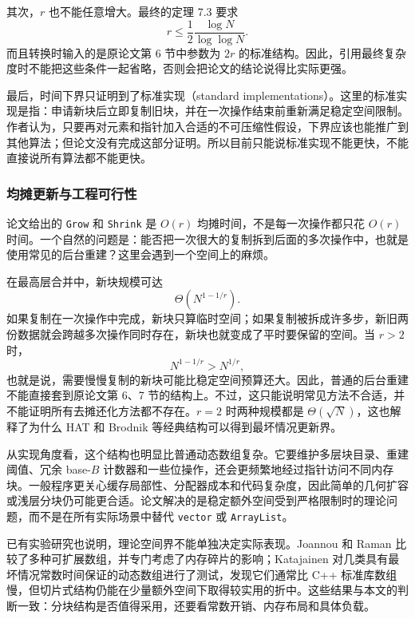 \documentclass[12pt,a4paper]{article}
\begin{document}
其次，$r$ 也不能任意增大。最终的定理 7.3 要求
\[
    r\leq \frac{1}{2}\frac{\log N}{\log\log N}.
\]
而且转换时输入的是原论文第 6 节中参数为 $2r$ 的标准结构\cite{tarjan2023optimalresizablearrays}。因此，引用最终复杂度时不能把这些条件一起省略，否则会把论文的结论说得比实际更强。

最后，时间下界只证明到了标准实现（standard implementations）。这里的标准实现是指：申请新块后立即复制旧块，并在一次操作结束前重新满足稳定空间限制。作者认为，只要再对元素和指针加入合适的不可压缩性假设，下界应该也能推广到其他算法；但论文没有完成这部分证明\cite{tarjan2023optimalresizablearrays}。所以目前只能说标准实现不能更快，不能直接说所有算法都不能更快。

\subsubsection{均摊更新与工程可行性}

论文给出的 \texttt{Grow} 和 \texttt{Shrink} 是 $O(r)$ 均摊时间，不是每一次操作都只花 $O(r)$ 时间。一个自然的问题是：能否把一次很大的复制拆到后面的多次操作中，也就是使用常见的后台重建？这里会遇到一个空间上的麻烦。

在最高层合并中，新块规模可达
\[
    \Theta(N^{1-1/r}).
\]
如果复制在一次操作中完成，新块只算临时空间；如果复制被拆成许多步，新旧两份数据就会跨越多次操作同时存在，新块也就变成了平时要保留的空间。当 $r>2$ 时，
\[
    N^{1-1/r}>N^{1/r},
\]
也就是说，需要慢慢复制的新块可能比稳定空间预算还大。因此，普通的后台重建不能直接套到原论文第 6、7 节的结构上。不过，这只能说明常见方法不合适，并不能证明所有去摊还化方法都不存在。$r=2$ 时两种规模都是 $\Theta(\sqrt{N})$，这也解释了为什么 HAT 和 Brodnik 等经典结构可以得到最坏情况更新界\cite{sitarski1996hats,brodnik1999resizable}。

从实现角度看，这个结构也明显比普通动态数组复杂。它要维护多层块目录、重建阈值、冗余 base-$B$ 计数器和一些位操作，还会更频繁地经过指针访问不同内存块。一般程序更关心缓存局部性、分配器成本和代码复杂度，因此简单的几何扩容或浅层分块仍可能更合适。论文解决的是稳定额外空间受到严格限制时的理论问题，而不是在所有实际场景中替代 \texttt{vector} 或 \texttt{ArrayList}。

已有实验研究也说明，理论空间界不能单独决定实际表现。Joannou 和 Raman 比较了多种可扩展数组，并专门考虑了内存碎片的影响\cite{joannou2011empirical}；Katajainen 对几类具有最坏情况常数时间保证的动态数组进行了测试，发现它们通常比 C++ 标准库数组慢，但切片式结构仍能在少量额外空间下取得较实用的折中\cite{katajainen2016worstcase}。这些结果与本文的判断一致：分块结构是否值得采用，还要看常数开销、内存布局和具体负载。
\end{document}

